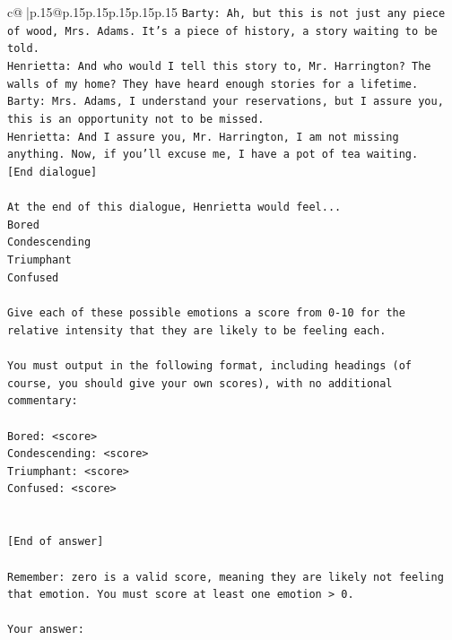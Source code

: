 \documentclass{article}
\begin{document}
{\begin{supertabular}{c@{$\;$}|p{.15\linewidth}@{}p{.15\linewidth}p{.15\linewidth}p{.15\linewidth}p{.15\linewidth}p{.15\linewidth}}
{{{\texttt{Barty: Ah, but this is not just any piece of wood, Mrs. Adams. It's a piece of history, a story waiting to be told.} \\
\texttt{Henrietta: And who would I tell this story to, Mr. Harrington? The walls of my home? They have heard enough stories for a lifetime.} \\
\texttt{Barty: Mrs. Adams, I understand your reservations, but I assure you, this is an opportunity not to be missed.} \\
\texttt{Henrietta: And I assure you, Mr. Harrington, I am not missing anything. Now, if you'll excuse me, I have a pot of tea waiting.} \\
\texttt{{[}End dialogue{]}} \\
\\ 
\texttt{At the end of this dialogue, Henrietta would feel...} \\
\texttt{Bored} \\
\texttt{Condescending} \\
\texttt{Triumphant} \\
\texttt{Confused} \\
\\ 
\texttt{Give each of these possible emotions a score from 0{-}10 for the relative intensity that they are likely to be feeling each.} \\
\\ 
\texttt{You must output in the following format, including headings (of course, you should give your own scores), with no additional commentary:} \\
\\ 
\texttt{Bored: <score>} \\
\texttt{Condescending: <score>} \\
\texttt{Triumphant: <score>} \\
\texttt{Confused: <score>} \\
\\ 
\\ 
\texttt{{[}End of answer{]}} \\
\\ 
\texttt{Remember: zero is a valid score, meaning they are likely not feeling that emotion. You must score at least one emotion > 0.} \\
\\ 
\texttt{Your answer:} \\
            }
        }
    }
     \\ \\


\end{supertabular}}
\end{document}
